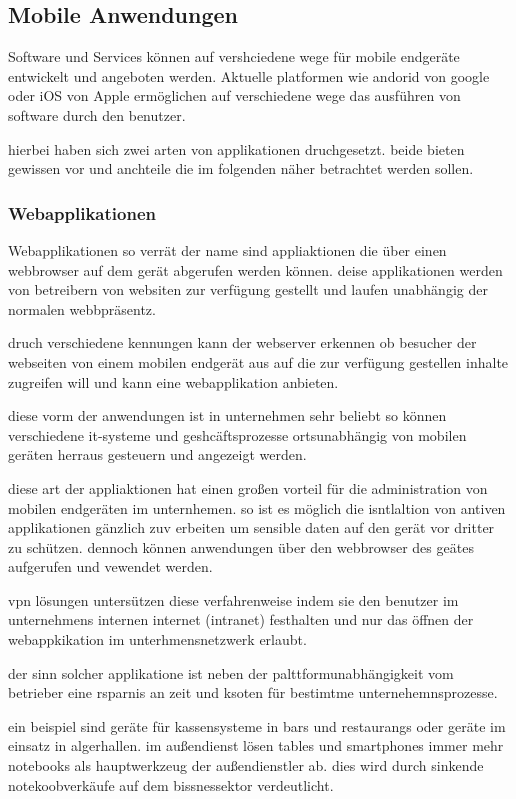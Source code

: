 \subsection{Mobile Anwendungen}
Software und Services können auf vershciedene wege für mobile endgeräte entwickelt und angeboten werden. Aktuelle platformen wie andorid von google oder iOS von Apple ermöglichen auf verschiedene wege das ausführen von software durch den benutzer.

hierbei haben sich zwei arten von applikationen druchgesetzt. beide bieten gewissen vor und anchteile die im folgenden näher betrachtet werden sollen.

\subsubsection{Webapplikationen}

Webapplikationen so verrät der name sind appliaktionen die über einen webbrowser auf dem gerät abgerufen werden können. deise applikationen werden von betreibern von websiten zur verfügung gestellt und laufen unabhängig der normalen webbpräsentz.

druch verschiedene kennungen kann der webserver erkennen ob besucher der webseiten von einem mobilen endgerät aus auf die zur verfügung gestellen inhalte zugreifen will und kann eine webapplikation anbieten.

diese vorm der anwendungen ist in unternehmen sehr beliebt so können verschiedene it-systeme und geshcäftsprozesse ortsunabhängig von mobilen geräten herraus gesteuern und angezeigt werden.

diese art der appliaktionen hat einen großen vorteil für die administration von mobilen endgeräten im unternhemen. so ist es möglich die isntlaltion von antiven applikationen gänzlich zuv erbeiten um sensible daten auf den gerät vor dritter zu schützen. dennoch können anwendungen über den webbrowser des geätes aufgerufen und vewendet werden.

vpn lösungen untersützen diese verfahrenweise indem sie den benutzer im unternehmens internen internet (intranet) festhalten und nur das öffnen der webappkikation im unterhmensnetzwerk erlaubt.

der sinn solcher applikatione ist neben der palttformunabhängigkeit vom betrieber eine rsparnis an zeit und ksoten für bestimtme unternehemnsprozesse.

ein beispiel sind geräte für kassensysteme in bars und restaurangs oder geräte im einsatz in algerhallen. im außendienst lösen tables und smartphones immer mehr notebooks als hauptwerkzeug der außendienstler ab. dies wird durch sinkende notekoobverkäufe auf dem bissnessektor verdeutlicht.

